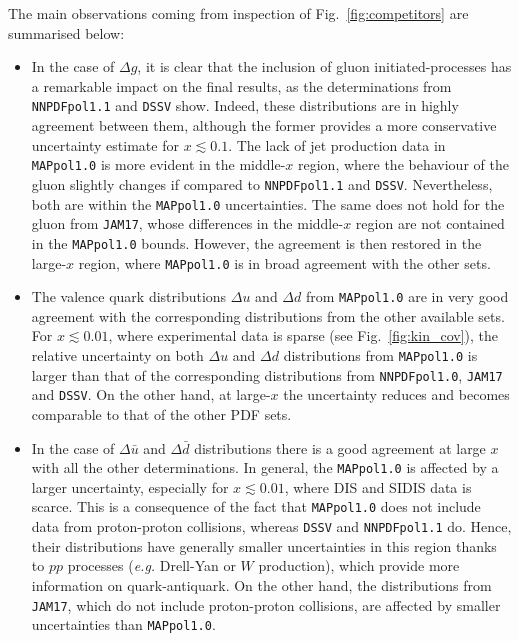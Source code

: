 The main observations coming from inspection of Fig.~\ref{fig:competitors} are summarised below:
\begin{itemize}
  \item In the case of $\Delta g$, it is clear that the inclusion of gluon initiated-processes has a remarkable impact on the final results, as the determinations from \texttt{NNPDFpol1.1} and \texttt{DSSV} show. Indeed, these distributions are in highly agreement between them, although the former provides a more conservative uncertainty estimate for $x \lesssim 0.1$. The lack of jet production data in \texttt{MAPpol1.0} is more evident in the middle-$x$ region, where the behaviour of the gluon slightly changes if compared to \texttt{NNPDFpol1.1} and \texttt{DSSV}. Nevertheless, both are within the \texttt{MAPpol1.0} uncertainties. The same does not hold for the gluon from \texttt{JAM17}, whose differences in the middle-$x$ region are not contained in the \texttt{MAPpol1.0} bounds. However, the agreement is then restored in the large-$x$ region, where \texttt{MAPpol1.0} is in broad agreement with the other sets.
  \item The valence quark distributions $\Delta u$ and $\Delta d$ from \texttt{MAPpol1.0} are in very good agreement with the corresponding distributions from the other available sets. For $x \lesssim 0.01$, where experimental data is sparse (see Fig.~\ref{fig:kin_cov}), the relative uncertainty on both $\Delta u$ and $\Delta d$ distributions from \texttt{MAPpol1.0} is larger than that of the corresponding distributions from \texttt{NNPDFpol1.0}, \texttt{JAM17} and \texttt{DSSV}. On the other hand, at large-$x$ the uncertainty reduces and becomes comparable to that of the other PDF sets.
  \item In the case of $\Delta \bar{u}$ and $\Delta \bar{d}$ distributions there is a good agreement at large $x$ with all the other determinations. In general, the \texttt{MAPpol1.0} is affected by a larger uncertainty, especially for $x \lesssim 0.01$, where DIS and SIDIS data is scarce. This is a consequence of the fact that \texttt{MAPpol1.0} does not include data from proton-proton collisions, whereas \texttt{DSSV} and \texttt{NNPDFpol1.1} do. Hence, their distributions have generally smaller uncertainties in this region thanks to $pp$ processes (\textit{e.g.} Drell-Yan or $W$ production), which provide more information on quark-antiquark. On the other hand, the distributions from \texttt{JAM17}, which do not include proton-proton collisions, are affected by smaller uncertainties than \texttt{MAPpol1.0}.

\end{itemize}
